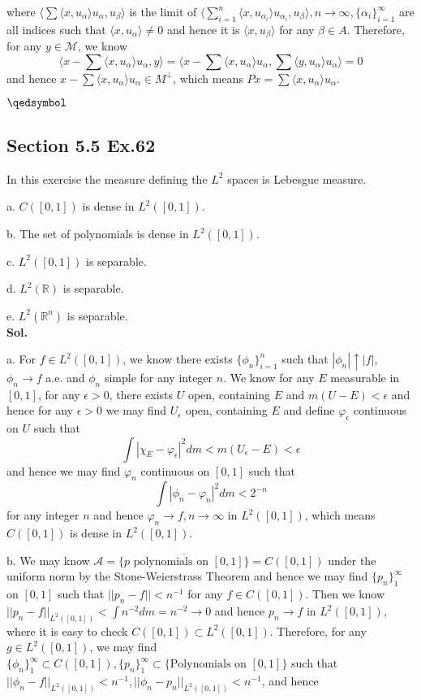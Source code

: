 \documentclass[lang=en,11pt,a4paper,citestyle =authoryear]{elegantpaper}
\newcommand{\prvd}{$\hfill \qedsymbol$}
\newcommand{\R}{\mathbb{R}}
\newcommand{\M}{\mathcal{M}}
\begin{document}
where $\langle \sum \langle x,u_{\alpha}\rangle u_{\alpha}, u_{\beta} \rangle$ is the limit of $\langle \sum\limits_{i=1}^n \langle x,u_{\alpha_i}\rangle u_{\alpha_i}, u_{\beta}\rangle,n\to\infty, \{\alpha_i\}_{i=1}^{\infty}$ are all indices such that $\langle x,u_{\alpha}\rangle \neq 0$ and hence it is $\langle x,u_{\beta}\rangle$ for any $\beta \in A$. Therefore, for any $y\in \M$, we know
\[\langle x - \sum\langle x,u_{\alpha}\rangle u_{\alpha}, y\rangle = \langle x - \sum\langle x,u_{\alpha}\rangle u_{\alpha},\sum\langle y,u_{\alpha}\rangle u_{\alpha}\rangle = 0 \]
and hence $x - \sum\langle x,u_{\alpha}\rangle u_{\alpha} \in M^{\perp}$, which means $Px = \sum\langle x,u_{\alpha}\rangle u_{\alpha}$.\par
\prvd
\vspace{0.5em}

\subsection*{Section 5.5 Ex.62} 
In this exercise the measure defining the $L^2$ spaces is Lebesgue measure.\par
a. $C([0,1])$ is dense in $L^2([0,1])$.\par
b. The set of polynomials is dense in $L^2([0,1])$.\par
c. $L^2([0,1])$ is separable.\par
d. $L^2(\R)$ is separable. \par
e. $L^2(\R^n)$ is separable. 
\vspace{0.5em}\\
\textbf{Sol.} \par
a. For $f\in L^2([0,1])$, we know there exists $\{\phi_n\}_{i=1}^n$ such that $|\phi_n| \uparrow |f|$, $\phi_n\to f$ a.e. and $\phi_n$ simple for any integer $n$. We know for any $E$ measurable in $[0,1]$, for any $\epsilon > 0$, there exists $U$ open, containing $E$ and $m(U-E) <\epsilon$ and hence for any $\epsilon > 0$ we may find $U_{\epsilon}$ open, containing $E$ and define $\varphi_{\epsilon}$ continuous on $U$ such that
\[\int |\chi_E - \varphi_{\epsilon}|^2 dm < m(U_{\epsilon}-E) < \epsilon\]
and hence we may find $\varphi_n$ continuous on $[0,1]$ such that
\[\int |\phi_n-\varphi_n|^2 dm < 2^{-n}\]
for any integer $n$ and hence $\varphi_n \to f, n\to\infty$ in $L^2([0,1])$, which means $C([0,1])$ is dense in $L^2([0,1])$.\par
b. We may know $\mathcal{A} = \overline{\{p\text{ polynomials on }[0,1]\}} = C([0,1])$ under the uniform norm by the Stone-Weierstrass Theorem and hence we may find $\{p_n\}_1^{\infty}$ on $[0,1]$ such that $||p_n-f|| < n^{-1}$ for any $f\in C([0,1])$. Then we know $||p_n-f||_{L^2([0,1])} < \int n^{-2}dm = n^{-2} \to 0$ and hence $p_n\to f$ in $L^2([0,1])$, where it is easy to check $C([0,1])\subset L^2([0,1])$. Therefore, for any $g\in L^2([0,1])$, we may find $\{\phi_n\}_1^{\infty}\subset C([0,1]), \{p_n\}_1^{\infty} \subset \{\text{Polynomials on }[0,1]\}$ such that $||\phi_n-f||_{L^2([0,1])} < n^{-1}, ||\phi_n-p_n||_{L^2([0,1])} < n^{-1}$, and hence
\end{document}
